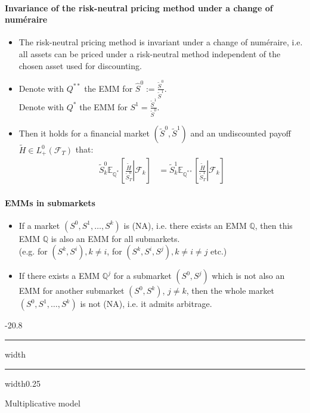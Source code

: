 \documentclass[a4paper,landscape,8pt,fleqn]{scrartcl}
\makeatletter
\renewcommand{\subsection}{\@startsection{subsection}{1}{0mm}%
{-2\baselineskip}{0.8\baselineskip}%
{\hrule depth 0.2pt width\columnwidth\hrule depth0.75pt
width0.25\columnwidth\vspace*{1.2em}\large\bfseries}}
\makeatother
\begin{document}
\begin{multicols*}{3}
\paragraph{Invariance of the risk-neutral pricing method under a change of numéraire}

\begin{itemize}
\item The risk-neutral pricing method is invariant under a change of numéraire, i.e. all assets can be priced under a risk-neutral method independent of the chosen asset used for discounting.
\item Denote with $Q^{\ast \ast}$ the EMM for $\hat S^0 := \frac{\tilde S^0}{\tilde S^1}$. \\
Denote with $Q^\ast$ the EMM for $S^1 = \frac{\tilde S^1}{\tilde S^0}$.
\item Then it holds for a financial market $(\tilde S^0, \tilde S^1)$ and an undiscounted payoff $\tilde H \in L^0_+(\mathcal{F}_T)$ that:
\begin{align*}
\tilde S^0_k \mathbb{E}_{\mathbb{Q}^\ast} \left[ \left. \frac{\tilde H}{\tilde S^0_T} \right\vert \mathcal{F}_k \right]
&= \tilde S^1_k \mathbb{E}_{\mathbb{Q}^{\ast \ast}} \left[ \left. \frac{\tilde H}{\tilde S^1_T} \right\vert \mathcal{F}_k \right]
\end{align*}
\end{itemize}

\paragraph{EMMs in submarkets}

\begin{itemize}
\item If a market $(S^0, S^1, \ldots, S^k)$ is (NA), i.e. there exists an EMM $\mathbb{Q}$, then this EMM $\mathbb{Q}$ is also an EMM for all submarkets. \\
(e.g. for $(S^k, S^i), k \neq i$, for $(S^k, S^i, S^j), k \neq i \neq j$ etc.)
\item If there exists a EMM $\mathbb{Q}^j$ for a submarket $(S^0, S^j)$ which is not also an EMM for another submarket $(S^0, S^k)$, $j \neq k$, then the whole market $(S^0, S^1, \ldots, S^k)$ is not (NA), i.e. it admits arbitrage.
\end{itemize}

\subsection{Multiplicative model}


\end{multicols*}
\end{document}
